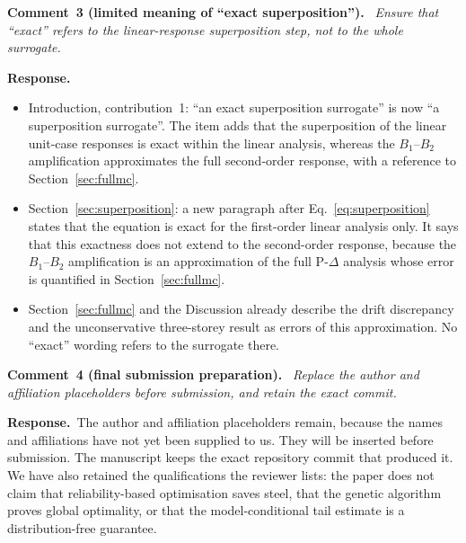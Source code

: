 \documentclass[11pt]{article}
\newenvironment{comment}[1]{\par\medskip\noindent\textbf{Comment~#1.}\ \itshape}{\par}
\newcommand{\resp}{\par\noindent\textbf{Response.}\ }
\begin{document}
\begin{comment}{3 (limited meaning of ``exact superposition'')}
Ensure that ``exact'' refers to the linear-response superposition step, not to the whole surrogate.
\end{comment}
\resp
\begin{itemize}[itemsep=0.1em]
\item Introduction, contribution~1: ``an exact superposition surrogate'' is now ``a superposition
surrogate''. The item adds that the superposition of the linear unit-case responses is exact within
the linear analysis, whereas the $B_1$--$B_2$ amplification approximates the full second-order response,
with a reference to Section~\ref{sec:fullmc}.
\item Section~\ref{sec:superposition}: a new paragraph after Eq.~\eqref{eq:superposition} states that
the equation is exact for the first-order linear analysis only. It says that this exactness does not
extend to the second-order response, because the $B_1$--$B_2$ amplification is an approximation of the
full P-$\Delta$ analysis whose error is quantified in Section~\ref{sec:fullmc}.
\item Section~\ref{sec:fullmc} and the Discussion already describe the drift discrepancy and the
unconservative three-storey result as errors of this approximation. No ``exact'' wording refers to the
surrogate there.
\end{itemize}

\begin{comment}{4 (final submission preparation)}
Replace the author and affiliation placeholders before submission, and retain the exact commit.
\end{comment}
\resp The author and affiliation placeholders remain, because the names and affiliations have not yet
been supplied to us. They will be inserted before submission. The manuscript keeps the exact
repository commit that produced it. We have also retained the qualifications the reviewer lists: the
paper does not claim that reliability-based optimisation saves steel, that the genetic algorithm
proves global optimality, or that the model-conditional tail estimate is a distribution-free
guarantee.
\end{document}
